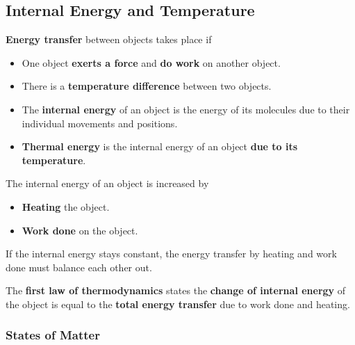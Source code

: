 \subsection{Internal Energy and Temperature}

\textbf{Energy transfer} between objects takes place if
\begin{itemize}
    \item One object \textbf{exerts a force} and \textbf{do work} on another object.
    \item There is a \textbf{temperature difference} between two objects.
\end{itemize}

\begin{itemize}
    \item The \textbf{internal energy} of an object is the energy of its molecules due to their individual movements and positions.
    \item \textbf{Thermal energy} is the internal energy of an object \textbf{due to its temperature}.
\end{itemize}

The internal energy of an object is increased by
\begin{itemize}
    \item \textbf{Heating} the object.
    \item \textbf{Work done} on the object.
\end{itemize}
If the internal energy stays constant, the energy transfer by heating and work done must balance each other out.

The \textbf{first law of thermodynamics} states the \textbf{change of internal energy} of the  object is equal to the \textbf{total energy transfer} due to work done and heating.

\subsubsection*{States of Matter}

